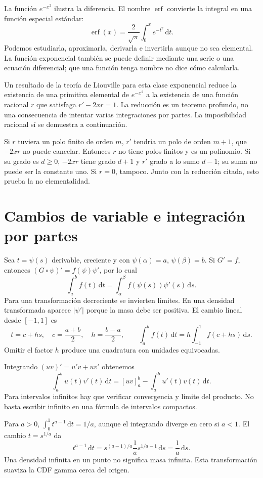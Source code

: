 \documentclass[11pt,a4paper]{article}
\newcommand{\dd}{\,\mathrm d}
\theoremstyle{definition}
\DeclareMathOperator{\erf}{erf}
\begin{document}
La función $e^{-x^2}$ ilustra la diferencia. El nombre $\erf$ convierte la integral en una función especial estándar:
\[
\erf(x)=\frac2{\sqrt\pi}\int_0^x e^{-t^2}\dd t.
\]
Podemos estudiarla, aproximarla, derivarla e invertirla aunque no sea elemental. La función exponencial también se puede definir mediante una serie o una ecuación diferencial; que una función tenga nombre no dice cómo calcularla.

\begin{cuidado}
Un resultado de la teoría de Liouville para esta clase exponencial reduce la existencia de una primitiva elemental de $e^{-x^2}$ a la existencia de una función racional $r$ que satisfaga $r'-2xr=1$. La reducción es un teorema profundo, no una consecuencia de intentar varias integraciones por partes. La imposibilidad racional sí se demuestra a continuación.
\end{cuidado}
Si $r$ tuviera un polo finito de orden $m$, $r'$ tendría un polo de orden $m+1$, que $-2xr$ no puede cancelar. Entonces $r$ no tiene polos finitos y es un polinomio. Si su grado es $d\ge0$, $-2xr$ tiene grado $d+1$ y $r'$ grado a lo sumo $d-1$; su suma no puede ser la constante uno. Si $r=0$, tampoco. Junto con la reducción citada, esto prueba la no elementalidad.

\section{Cambios de variable e integración por partes}
Sea $t=\psi(s)$ derivable, creciente y con $\psi(\alpha)=a$, $\psi(\beta)=b$. Si $G'=f$, entonces $(G\circ\psi)'=f(\psi)\psi'$, por lo cual
\[
\int_a^b f(t)\dd t=\int_\alpha^\beta f(\psi(s))\psi'(s)\dd s.
\]
Para una transformación decreciente se invierten límites. En una densidad transformada aparece $|\psi'|$ porque la masa debe ser positiva. El cambio lineal desde $[-1,1]$ es
\[
t=c+hs,\quad c=\frac{a+b}2,\quad h=\frac{b-a}2,\qquad
\int_a^b f(t)\dd t=h\int_{-1}^1 f(c+hs)\dd s.
\]
Omitir el factor $h$ produce una cuadratura con unidades equivocadas.

Integrando $(uv)'=u'v+uv'$ obtenemos
\[
\int_a^b u(t)v'(t)\dd t=[uv]_a^b-\int_a^b u'(t)v(t)\dd t.
\]
Para intervalos infinitos hay que verificar convergencia y límite del producto. No basta escribir infinito en una fórmula de intervalos compactos.

\begin{ejemplo}
Para $a>0$, $\int_0^1t^{a-1}\dd t=1/a$, aunque el integrando diverge en cero si $a<1$. El cambio $t=s^{1/a}$ da
\[
t^{a-1}\dd t=s^{(a-1)/a}\frac1a s^{1/a-1}\dd s=\frac1a\dd s.
\]
Una densidad infinita en un punto no significa masa infinita. Esta transformación suaviza la CDF gamma cerca del origen.
\end{ejemplo}
\end{document}
